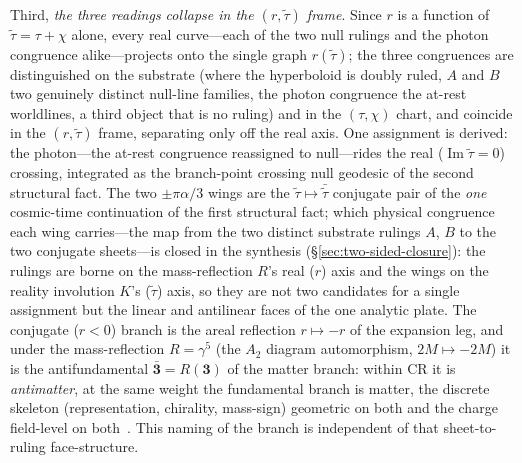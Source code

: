 \documentclass[11pt,a4paper]{article}
\theoremstyle{plain}
\theoremstyle{definition}
\theoremstyle{remark}
\begin{document}
Third, \emph{the three readings collapse in the $(r,\tilde\tau)$ frame}. Since $r$ is a function of $\tilde\tau=\tau+\chi$ alone, every real curve---each of the two null rulings and the photon congruence alike---projects onto the single graph $r(\tilde\tau)$; the three congruences are distinguished on the substrate (where the hyperboloid is doubly ruled, $A$ and $B$ two genuinely distinct null-line families, the photon congruence the at-rest worldlines, a third object that is no ruling) and in the $(\tau,\chi)$ chart, and coincide in the $(r,\tilde\tau)$ frame, separating only off the real axis. One assignment is derived: the photon---the at-rest congruence reassigned to null---rides the real ($\operatorname{Im}\tilde\tau=0$) crossing, integrated as the branch-point crossing null geodesic of the second structural fact. The two $\pm\pi\alpha/3$ wings are the $\tilde\tau\mapsto\bar{\tilde\tau}$ conjugate pair of the \emph{one} cosmic-time continuation of the first structural fact; which physical congruence each wing carries---the map from the two distinct substrate rulings $A$, $B$ to the two conjugate sheets---is closed in the synthesis (\S\ref{sec:two-sided-closure}): the rulings are borne on the mass-reflection $R$'s real ($r$) axis and the wings on the reality involution $K$'s ($\tilde\tau$) axis, so they are not two candidates for a single assignment but the linear and antilinear faces of the one analytic plate. The conjugate ($r<0$) branch is the areal reflection $r\mapsto-r$ of the expansion leg, and under the mass-reflection $R=\gamma^5$ (the $A_2$ diagram automorphism, $2M\mapsto-2M$) it is the antifundamental $\bar{\mathbf 3}=R(\mathbf 3)$ of the matter branch: within CR it is \emph{antimatter}, at the same weight the fundamental branch is matter, the discrete skeleton (representation, chirality, mass-sign) geometric on both and the charge field-level on both~\cite{JanzenMatter,JanzenBoundary}. This naming of the branch is independent of that sheet-to-ruling face-structure.
\end{document}
